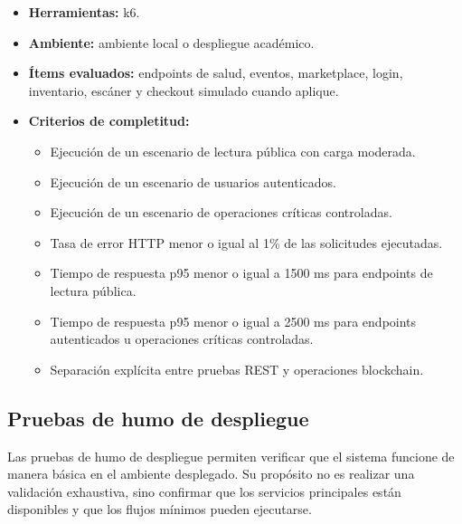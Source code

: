 \documentclass[12pt,letterpaper]{article}
\begin{document}
\begin{itemize}
    \item \textbf{Herramientas:} k6.
    \item \textbf{Ambiente:} ambiente local o despliegue académico.
    \item \textbf{Ítems evaluados:} endpoints de salud, eventos, marketplace, login, inventario, escáner y checkout simulado cuando aplique.
    \item \textbf{Criterios de completitud:}
    \begin{itemize}
        \item Ejecución de un escenario de lectura pública con carga moderada.
        \item Ejecución de un escenario de usuarios autenticados.
        \item Ejecución de un escenario de operaciones críticas controladas.
        \item Tasa de error HTTP menor o igual al 1\% de las solicitudes ejecutadas.
        \item Tiempo de respuesta p95 menor o igual a 1500 ms para endpoints de lectura pública.
        \item Tiempo de respuesta p95 menor o igual a 2500 ms para endpoints autenticados u operaciones críticas controladas.
        \item Separación explícita entre pruebas REST y operaciones blockchain.
    \end{itemize}
\end{itemize}

\subsection{Pruebas de humo de despliegue}

Las pruebas de humo de despliegue permiten verificar que el sistema funcione de manera básica en el ambiente desplegado. Su propósito no es realizar una validación exhaustiva, sino confirmar que los servicios principales están disponibles y que los flujos mínimos pueden ejecutarse.
\end{document}
